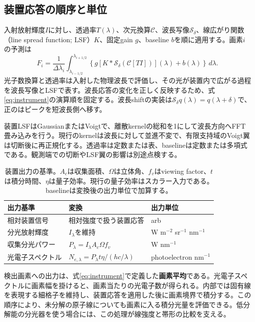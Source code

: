 \subsection{装置応答の順序と単位}
入射放射輝度$I$に対し、透過率$T(\lambda)$、次元換算$\mathcal C$、波長写像$\mathcal S_\delta$、線広がり関数（line spread function; LSF）$K$、固定gain $g$、baseline $b$を順に適用する。画素$i$の予測は
\begin{equation}
F_i=\frac{1}{\Delta\lambda_i}\int_{\lambda_{i-1/2}}^{\lambda_{i+1/2}}
\left\{g\left[K*\mathcal S_\delta\!\left(\mathcal C[TI]\right)\right](\lambda)
+b(\lambda)\right\}\,d\lambda .
\label{eq:instrument}
\end{equation}
光子数換算と透過率は入射した物理波長で評価し、その光が装置内で広がる過程を波長写像とLSFで表す。波長応答の変化を正しく反映するため、式\eqref{eq:instrument}の演算順を固定する。波長shiftの実装は$\mathcal S_\delta q(\lambda)=q(\lambda+\delta)$で、正のはピークを短波長側へ移す。

装置LSFはGaussianまたはVoigtで、離散kernelの総和を1にして波長方向へFFT畳み込みを行う。現行のkernelは波長に対して並進不変で、有限支持域のVoigt翼は切断後に再正規化する。透過率は定数または表、baselineは定数または多項式である。観測端での切断やLSF翼の影響は別途点検する。

\begin{table}[htbp]
\centering\small
\begin{tabularx}{\linewidth}{p{35mm}p{48mm}Y}
\toprule
出力基準 & 変換 & 出力単位 \\
\midrule
相対装置信号 & 相対強度で扱う装置応答 & arb \\
分光放射輝度 & $I_\lambda$を維持 & W m$^{-2}$ sr$^{-1}$ nm$^{-1}$ \\
収集分光パワー & $P_\lambda=I_\lambda A_c\Omega f_v$ & W nm$^{-1}$ \\
光電子スペクトル & $N_{e,\lambda}=P_\lambda t\eta/(hc/\lambda)$ & photoelectron nm$^{-1}$ \\
\bottomrule
\end{tabularx}
\caption{装置出力の基準。$A_c$は収集面積、$\Omega$は立体角、$f_v$はviewing factor、$t$は積分時間、$\eta$は量子効率。現行の量子効率はスカラー入力である。baselineは変換後の出力単位で加算する。}
\end{table}

検出画素への出力は、式\eqref{eq:instrument}で定義した\textbf{画素平均}である。光電子スペクトルに画素幅を掛けると、画素当たりの光電子数が得られる。内部では固有線を表現する細格子を維持し、装置応答を適用した後に画素境界で積分する。この順序により、未分解の原子線についても画素に入る積分光量を評価できる。低分解能の分光器を使う場合には、この処理が線強度と帯形の比較を支える。
